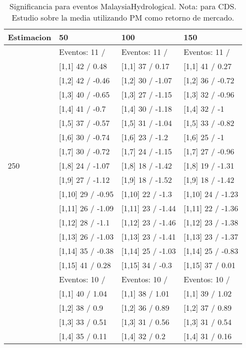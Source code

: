 \begin{table}

\caption{Significancia para eventos MalaysiaHydrological. Nota: para CDS. Estudio sobre la media utilizando PM como retorno de mercado.}
\centering
\begin{tabular}[t]{llll}
\toprule
Estimacion & 50 & 100 & 150\\
\midrule
 & Eventos:  11 / & Eventos:  11 / & Eventos:  11 /\\
 & {}[1,1] 42  / 0.48 & {}[1,1] 37  / 0.17 & {}[1,1] 41  / 0.27\\
 & {}[1,2] 42  / -0.46 & {}[1,2] 30  / -1.07 & {}[1,2] 36  / -0.72\\
 & {}[1,3] 40  / -0.65 & {}[1,3] 27  / -1.15 & {}[1,3] 32  / -0.96\\
 & {}[1,4] 41  / -0.7 & {}[1,4] 30  / -1.18 & {}[1,4] 32  / -1\\
\addlinespace
 & {}[1,5] 37  / -0.57 & {}[1,5] 31  / -1.04 & {}[1,5] 33  / -0.82\\
 & {}[1,6] 30  / -0.74 & {}[1,6] 23  / -1.2 & {}[1,6] 25  / -1\\
 & {}[1,7] 30  / -0.72 & {}[1,7] 24  / -1.15 & {}[1,7] 27  / -0.96\\
250 & {}[1,8] 24  / -1.07 & {}[1,8] 18  / -1.42 & {}[1,8] 19  / -1.31\\
 & {}[1,9] 27  / -1.12 & {}[1,9] 18  / -1.52 & {}[1,9] 18  / -1.42\\
\addlinespace
 & {}[1,10] 29  / -0.95 & {}[1,10] 22  / -1.3 & {}[1,10] 24  / -1.23\\
 & {}[1,11] 26  / -1.09 & {}[1,11] 23  / -1.44 & {}[1,11] 22  / -1.36\\
 & {}[1,12] 28  / -1.1 & {}[1,12] 23  / -1.46 & {}[1,12] 23  / -1.38\\
 & {}[1,13] 26  / -1.03 & {}[1,13] 23  / -1.41 & {}[1,13] 23  / -1.37\\
 & {}[1,14] 35  / -0.38 & {}[1,14] 25  / -1.03 & {}[1,14] 25  / -0.83\\
\addlinespace
 & {}[1,15] 41  / 0.28 & {}[1,15] 34  / -0.3 & {}[1,15] 37  / 0.01\\
 & Eventos:  10 / & Eventos:  10 / & Eventos:  10 /\\
 & {}[1,1] 40  / 1.04 & {}[1,1] 38  / 1.01 & {}[1,1] 39  / 1.02\\
 & {}[1,2] 38  / 0.9 & {}[1,2] 36  / 0.89 & {}[1,2] 37  / 0.89\\
 & {}[1,3] 33  / 0.51 & {}[1,3] 31  / 0.56 & {}[1,3] 31  / 0.54\\
\addlinespace
 & {}[1,4] 35  / 0.11 & {}[1,4] 32  / 0.2 & {}[1,4] 31  / 0.16\\

\end{tabular}
\end{table}
